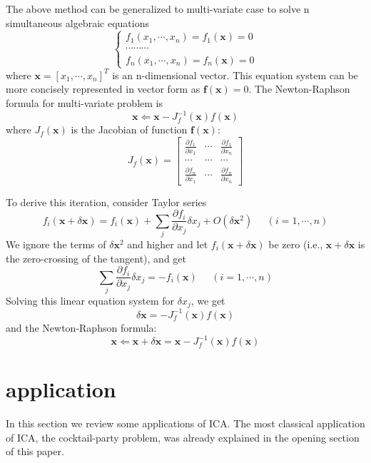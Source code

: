 \documentclass[12pt, a4paper, onecolumn]{IEEEtran}
\begin{document}
The above method can be generalized to multi-variate case to solve n simultaneous
algebraic equations
\[ \left\{ \begin{array}{c} f_1(x_1,\cdots,x_n)=f_1({\mathbf x})=0	\\
		\cdots \cdots \cdots	\\
		f_n(x_1,\cdots,x_n)=f_n({\mathbf x})=0	\end{array} \right.	\]
where ${\mathbf x}=[x_1,\cdots,x_n]^T$ is an n-dimensional vector. This equation
system can be more concisely represented in vector form as
${\mathbf f}({\mathbf x})=0$. The Newton-Raphson formula for multi-variate
problem is
\[ {\mathbf x} \Leftarrow {\mathbf x}-J_f^{-1}({\mathbf x}) f({\mathbf x}) \]
where $J_f({\mathbf x})$ is the Jacobian of function ${\mathbf f}({\mathbf x})$:
\[	J_f( {\mathbf x})=\left[ \begin{array}{ccc}
\frac{\partial f_1}{\partial x_1} & \cdots & \frac{\partial f_1}{\partial x_n} \\
	\cdots	& \cdots & \cdots 	\\
\frac{\partial f_n}{\partial x_1} & \cdots & \frac{\partial f_n}{\partial x_n}
	\end{array}	\right]	\]

To derive this iteration, consider Taylor series
\[	f_i( {\mathbf x}+\delta {\mathbf x})=
	f_i( {\mathbf x}) +\sum_j \frac{\partial f_i}{\partial x_j} \delta x_j
	+O(\delta {\mathbf x}^2)\;\;\;\;\;(i=1,\cdots,n)
\]
We ignore the terms of $\delta {\mathbf x}^2$ and higher and let
$f_i( {\mathbf x}+\delta {\mathbf x})$ be zero (i.e., ${\mathbf x}+\delta {\mathbf x}$
is the zero-crossing of the tangent),  and get
\[	\sum_j \frac{\partial f_i}{\partial x_j} \delta x_j=-f_i( {\mathbf x})
	\;\;\;\;\;(i=1,\cdots,n) \]
Solving this linear equation system for $\delta x_j$, we get
\[ \delta {\mathbf x}=-J_f^{-1}({\mathbf x}) f({\mathbf x}) \]
and the Newton-Raphson formula:
\[ {\mathbf x} \Leftarrow {\mathbf x}+\delta {\mathbf x}=
{\mathbf x}-J_f^{-1}({\mathbf x}) f({\mathbf x}) \]

\section{application}
In this section we review some applications of ICA. The most classical application of ICA, the cocktail-party problem, was already explained in the opening section of this paper.
\end{document}
